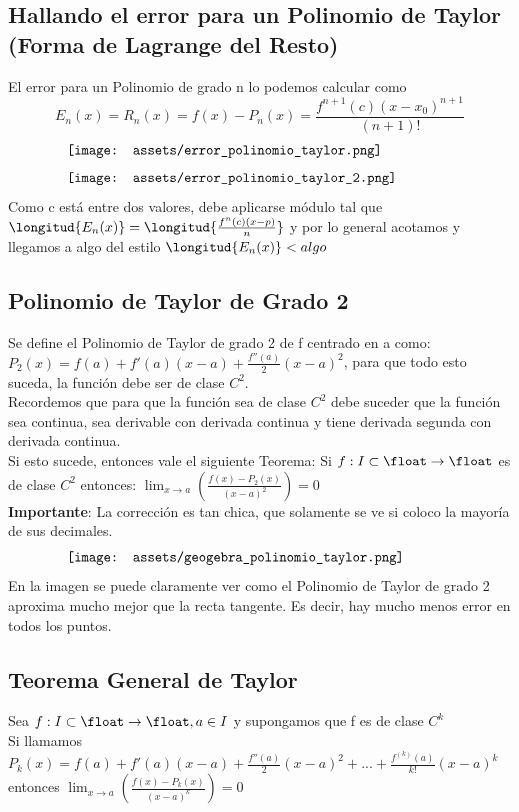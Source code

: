 \documentclass[10pt,a4paper]{article}
\begin{document}
\subsection*{Hallando el error para un Polinomio de Taylor (Forma de Lagrange del Resto)}
El error para un Polinomio de grado n lo podemos calcular como 
\[E_{n}(x) = R_{n}(x) = f(x) - P_{n}(x) = \frac{f^{n+1}(c)(x-x_{0})^{n+1}}{(n+1)!}\]
\[\begin{minipage}[b]{0.8\textwidth}
    \texttt{[image: assets/error\_polinomio\_taylor.png]}
\end{minipage}\]
\[\begin{minipage}[b]{0.8\textwidth}
    \texttt{[image: assets/error\_polinomio\_taylor\_2.png]}
\end{minipage}\]
Como c está entre dos valores, debe aplicarse módulo tal que $\longitud{E_{n}(x)} = \longitud{\frac{f^{n}(c)(x-p)}{n}}$ y por lo general acotamos y llegamos a algo del estilo $\longitud{E_{n}(x)} < algo$
\subsection*{Polinomio de Taylor de Grado 2}
Se define el Polinomio de Taylor de grado 2 de f centrado en a como: $P_{2}(x) = f(a) + f'(a)(x-a)+\frac{f''(a)}{2}(x-a)^{2}$, para que todo esto suceda, la función debe ser de clase $C^{2}$. \\
Recordemos que para que la función sea de clase $C^{2}$ debe suceder que la función sea continua, sea derivable con derivada continua y tiene derivada segunda con derivada continua. \\
Si esto sucede, entonces vale el siguiente Teorema: Si $f:I \subset \float \rightarrow \float$ es de clase $C^{2}$ entonces: $\lim_{x \to a} \left(\frac{f(x) - P_{2}(x)}{(x-a)^{2}}  \right) = 0$ \\
\textbf{Importante}: La corrección es tan chica, que solamente se ve si coloco la mayoría de sus decimales.
\[\begin{minipage}[b]{0.8\textwidth}
    \texttt{[image: assets/geogebra\_polinomio\_taylor.png]}
\end{minipage}\]
En la imagen se puede claramente ver como el Polinomio de Taylor de grado 2 aproxima mucho mejor que la recta tangente. Es decir, hay mucho menos error en todos los puntos.
\subsection*{Teorema General de Taylor}
Sea $f:I \subset \float \rightarrow \float, a \in I$ y supongamos que f es de clase $C^{k}$ \\
Si llamamos $P_{k}(x) = f(a) + f'(a)(x-a) + \frac{f''(a)}{2}(x-a)^{2} + ... + \frac{f^{(k)}(a)}{k!}(x-a)^{k}$ entonces $\lim_{x \to a} \left(\frac{f(x) - P_{k}(x)}{(x-a)^{k}}  \right) = 0$
\end{document}
